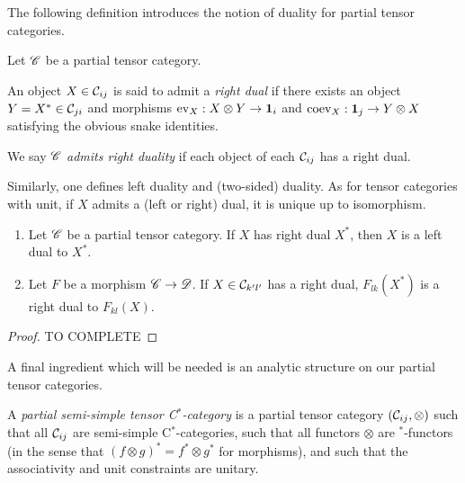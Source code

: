 The following definition introduces the notion of duality for partial tensor categories.

\begin{Def} Let $\mathscr{C}$ be a partial tensor category. 

An object $X\in \mathcal{C}_{ij}$ is said to admit a \emph{right dual} if there exists an object $Y=X^* \in \mathcal{C}_{ji}$ and morphisms $\mathrm{ev}_{X}: X\otimes Y \rightarrow \mathbf{1}_i$ and $\mathrm{coev}_X: \mathbf{1}_j\rightarrow Y\otimes X$ satisfying the obvious snake identities.

We say $\mathscr{C}$ \emph{admits right duality} if each object of each $\mathcal{C}_{ij}$ has a right dual.
\end{Def}

Similarly, one defines left duality and (two-sided) duality. As for tensor categories with unit, if $X$ admits a (left or right) dual, it is unique up to isomorphism. 

\begin{Lem}\label{LemMorDua}
\begin{enumerate}
\item Let $\mathscr{C}$ be a partial tensor category. If $X$ has right dual $X^*$, then $X$ is a left dual to $X^*$. 
\item Let $F$ be a morphism $\mathscr{C}\rightarrow \mathscr{D}$. If $X\in \mathcal{C}_{k'l'}$ has a right dual, $F_{lk}(X^*)$ is a right dual to $F_{kl}(X)$.
 \end{enumerate}
\end{Lem}
\begin{proof}
TO COMPLETE
\end{proof}

A final ingredient which will be needed is an analytic structure on our partial tensor categories.

\begin{Def} A \emph{partial semi-simple tensor C$^*$-category} is a partial tensor category $(\mathcal{C}_{ij},\otimes)$ such that all $\mathcal{C}_{ij}$ are semi-simple C$^*$-categories, such that all functors $\otimes$ are $^*$-functors (in the sense that $(f\otimes g)^* = f^*\otimes g^*$ for morphisms), and such that the associativity and unit constraints are unitary.
\end{Def} 



